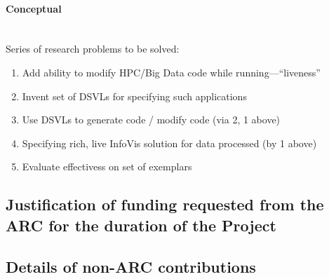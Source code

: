 \documentclass[a4paper,fontsize=12pt]{scrartcl}
\begin{document}

\paragraph*{Conceptual}\mbox{}\\

Series of research problems to be solved:

\begin{enumerate}
\item Add ability to modify HPC/Big Data code while
  running---``liveness''
\item Invent set of DSVLs for specifying such applications
\item Use DSVLs to generate code / modify code (via 2, 1 above)
\item Specifying rich, live InfoVis solution for data processed (by 1
  above)
\item Evaluate effectivess on set of exemplars
\end{enumerate}

\newpage
\setcounter{section}{5} %
\setcounter{subsection}{0}
\subsection{Justification of funding requested from the ARC for the
  duration of the Project}
\label{sec:funding-justification}



\newpage
\subsection{Details of non-ARC contributions}
\label{sec:non-arc-contributions}
\end{document}
